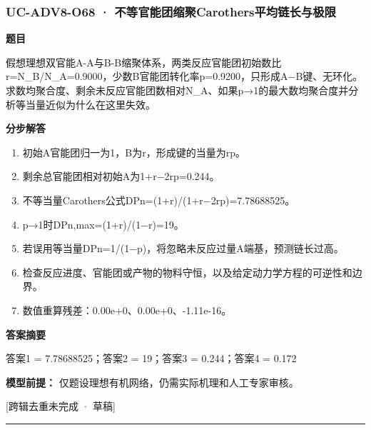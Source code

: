 \documentclass[UTF8,11pt,a4paper]{ctexart}
\begin{document}
\subsubsection*{UC-ADV8-O68 · 不等官能团缩聚Carothers平均链长与极限}
\noindent\textbf{题目}\par
假想理想双官能A-A与B-B缩聚体系，两类反应官能团初始数比r=N\_B/N\_A=0.9000，少数B官能团转化率p=0.9200，只形成A−B键、无环化。求数均聚合度、剩余未反应官能团数相对N\_A、如果p→1的最大数均聚合度并分析等当量近似为什么在这里失效。\par
\medskip\noindent\textbf{分步解答}
\begin{enumerate}
\item 初始A官能团归一为1，B为r，形成键的当量为rp。
\item 剩余总官能团相对初始A为1+r−2rp=0.244。
\item 不等当量Carothers公式DPn=(1+r)/(1+r−2rp)=7.78688525。
\item p→1时DPn,max=(1+r)/(1−r)=19。
\item 若误用等当量DPn=1/(1−p)，将忽略未反应过量A端基，预测链长过高。
\item 检查反应进度、官能团或产物的物料守恒，以及给定动力学方程的可逆性和边界。
\item 数值重算残差：0.00e+0、0.00e+0、-1.11e-16。
\end{enumerate}
\noindent\textbf{答案摘要}\par
答案1 = 7.78688525；答案2 = 19；答案3 = 0.244；答案4 = 0.172\par
\noindent\textbf{模型前提：}
仅题设理想有机网络，仍需实际机理和人工专家审核。\par
\noindent\textcolor{red!65!black}{[跨辑去重未完成 · 草稿]} \par
\medskip\hrule\medskip
{}
\end{document}
